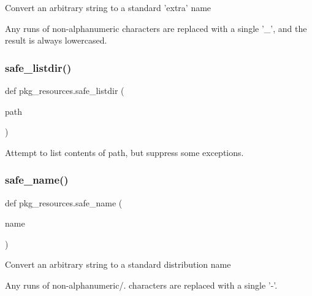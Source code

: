 \begin{DoxyVerb}Convert an arbitrary string to a standard 'extra' name

Any runs of non-alphanumeric characters are replaced with a single '_',
and the result is always lowercased.
\end{DoxyVerb}
 \mbox{\label{namespacepkg__resources_a24a292f7cca8e380c17105cfc9d88955}} 
\subsubsection{\texorpdfstring{safe\+\_\+listdir()}{safe\_listdir()}}
{\footnotesize\ttfamily def pkg\+\_\+resources.\+safe\+\_\+listdir (\begin{DoxyParamCaption}\item[{}]{path }\end{DoxyParamCaption})}

\begin{DoxyVerb}Attempt to list contents of path, but suppress some exceptions.
\end{DoxyVerb}
 \mbox{\label{namespacepkg__resources_a9635d106e0984b74bbcd80646e7a7384}} 
\subsubsection{\texorpdfstring{safe\+\_\+name()}{safe\_name()}}
{\footnotesize\ttfamily def pkg\+\_\+resources.\+safe\+\_\+name (\begin{DoxyParamCaption}\item[{}]{name }\end{DoxyParamCaption})}

\begin{DoxyVerb}Convert an arbitrary string to a standard distribution name

Any runs of non-alphanumeric/. characters are replaced with a single '-'.
\end{DoxyVerb}
 \mbox{\label{namespacepkg__resources_a20ac952ffecf95bf3d88e9a15251ab80}} 
